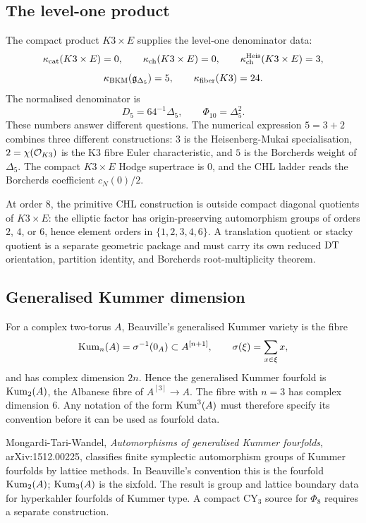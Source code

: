 \subsection*{The level-one product}

The compact product $K3\times E$ supplies the level-one denominator
data:
\[
  \kappa_{\mathrm{cat}}(K3\times E)=0,\qquad
  \kappa_{\mathrm{ch}}(K3\times E)=0,\qquad
  \kappa_{\mathrm{ch}}^{\mathrm{Heis}}(K3\times E)=3,
\]
\[
  \kappa_{\mathrm{BKM}}(\mathfrak g_{\Delta_5})=5,\qquad
  \kappa_{\mathrm{fiber}}(K3)=24.
\]
The normalised denominator is
\[
  D_5=64^{-1}\Delta_5,\qquad \Phi_{10}=\Delta_5^2 .
\]
These numbers answer different questions. The numerical expression
$5=3+2$ combines three different constructions: \(3\) is the
Heisenberg-Mukai specialisation, \(2=\chi(\mathcal{O}_{K3})\) is the K3 fibre
Euler characteristic, and \(5\) is the Borcherds weight of \(\Delta_5\).
The compact $K3\times E$ Hodge supertrace is \(0\), and the CHL ladder
reads the Borcherds coefficient \(c_N(0)/2\).

At order $8$, the primitive CHL construction is outside compact diagonal
quotients of $K3\times E$: the elliptic factor has origin-preserving
automorphism groups of orders \(2\), \(4\), or \(6\), hence element
orders in \(\{1,2,3,4,6\}\). A translation quotient or stacky quotient is
a separate geometric package and must carry its own reduced $\mathrm{DT}$
orientation, partition identity, and Borcherds root-multiplicity
theorem.

\subsection*{Generalised Kummer dimension}

For a complex two-torus $A$, Beauville's generalised Kummer variety is
the fibre
\[
  \mathrm{Kum}_n(A)
  =
  \sigma^{-1}(0_A)
  \subset A^{[n+1]},
  \qquad
  \sigma(\xi)=\sum_{x\in \xi}x ,
\]
and has complex dimension $2n$. Hence the generalised Kummer fourfold
is $\mathrm{Kum}_2(A)$, the Albanese fibre of $A^{[3]}\to A$. The fibre with
$n=3$ has complex dimension $6$. Any notation of the form
$\mathrm{Kum}^3(A)$ must therefore specify its convention before it can be used
as fourfold data.

Mongardi-Tari-Wandel, \emph{Automorphisms of generalised Kummer
fourfolds}, arXiv:1512.00225, classifies finite symplectic automorphism
groups of Kummer fourfolds by lattice methods. In Beauville's
convention this is the fourfold \(\mathrm{Kum}_2(A)\); \(\mathrm{Kum}_3(A)\) is the
sixfold. The result is group and lattice boundary data for hyperkahler
fourfolds of Kummer type. A compact CY$_3$ source for $\Phi_8$ requires
a separate construction.

